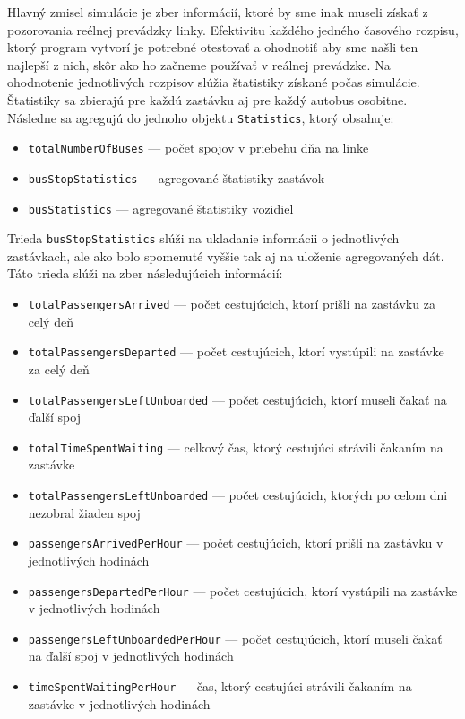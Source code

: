 Hlavný zmisel simulácie je zber informácií, ktoré by sme inak museli získať z pozorovania reélnej prevádzky linky.
Efektivitu každého jedného časového rozpisu, ktorý program vytvorí je potrebné otestovať a ohodnotiť aby sme našli ten najlepší z nich, skôr ako ho začneme používať v reálnej prevádzke.
Na ohodnotenie jednotlivých rozpisov slúžia štatistiky získané počas simulácie.
Štatistiky sa zbierajú pre každú zastávku aj pre každý autobus osobitne.
Následne sa agregujú do jednoho objektu \texttt{Statistics}, ktorý obsahuje:
\begin{itemize}
  \item \texttt{totalNumberOfBuses} --- počet spojov v priebehu dňa na linke
  \item \texttt{busStopStatistics} --- agregované štatistiky zastávok
  \item \texttt{busStatistics} --- agregované štatistiky vozidiel
\end{itemize}

Trieda \texttt{busStopStatistics} slúži na ukladanie informácii o jednotlivých zastávkach, ale ako bolo spomenuté vyššie tak aj na uloženie agregovaných dát.
Táto trieda slúži na zber následujúcich informácií:
\begin{itemize}
  \item \texttt{totalPassengersArrived} --- počet cestujúcich, ktorí prišli na zastávku za celý deň
  \item \texttt{totalPassengersDeparted} --- počet cestujúcich, ktorí vystúpili na zastávke za celý deň
  \item \texttt{totalPassengersLeftUnboarded} --- počet cestujúcich, ktorí museli čakať na ďalší spoj
  \item \texttt{totalTimeSpentWaiting} --- celkový čas, ktorý cestujúci strávili čakaním na zastávke
  \item \texttt{totalPassengersLeftUnboarded} --- počet cestujúcich, ktorých po celom dni nezobral žiaden spoj
  \item \texttt{passengersArrivedPerHour} --- počet cestujúcich, ktorí prišli na zastávku v jednotlivých hodinách
  \item \texttt{passengersDepartedPerHour} --- počet cestujúcich, ktorí vystúpili na zastávke v jednotlivých hodinách
  \item \texttt{passengersLeftUnboardedPerHour} --- počet cestujúcich, ktorí museli čakať na ďalší spoj v jednotlivých hodinách
  \item \texttt{timeSpentWaitingPerHour} --- čas, ktorý cestujúci strávili čakaním na zastávke v jednotlivých hodinách
\end{itemize}

